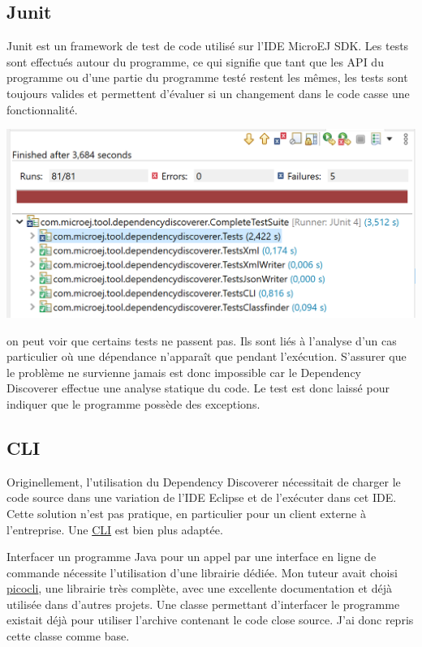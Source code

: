 \documentclass[french,a4paper,12pt]{report}
\begin{document}
\subsection{Junit}

Junit est un framework de test de code utilisé sur l’IDE MicroEJ SDK. Les tests sont effectués autour du programme, ce qui signifie que tant que les API du programme ou d'une partie du programme testé restent les mêmes, les tests sont toujours valides et permettent d’évaluer si un changement dans le code casse une fonctionnalité.

\begin{center}
 	\includegraphics[width=\textwidth]{ressources/images/junit.png}
\end{center}

on peut voir que certains tests ne passent pas. Ils sont liés à l'analyse d'un cas particulier où une dépendance n’apparaît que pendant l’exécution. S'assurer que le problème ne survienne jamais est donc impossible car le Dependency Discoverer effectue une analyse statique du code. Le test est donc laissé pour indiquer que le programme possède des exceptions.

\subsection{CLI}

Originellement, l'utilisation du Dependency Discoverer nécessitait de charger le code source dans une variation de l'IDE Eclipse et de l’exécuter dans cet IDE. Cette solution n'est pas pratique, en particulier pour un client externe à l'entreprise. Une \hyperlink{CLI}{CLI} est bien plus adaptée.

Interfacer un programme Java pour un appel par une interface en ligne de commande nécessite l’utilisation d’une librairie dédiée. Mon tuteur avait choisi \href{https://picocli.info/}{picocli}, une librairie très complète, avec une excellente documentation et déjà utilisée dans d'autres projets. Une classe permettant d’interfacer le programme existait déjà pour utiliser l’archive contenant le code close source. J’ai donc repris cette classe comme base. 
\end{document}
